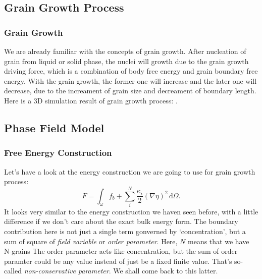 \documentclass[compress,xcolor={dvipsnames}]{beamer}
\newcommand{\bhref}[2]{
    \href{#1}{\color{blue}{#2}}
}
\begin{document}
\subsection{Grain Growth Process}
\begin{frame}
    \frametitle{Grain Growth}

    We are already familiar with the concepts of grain growth. After nucleation of grain from liquid or solid phase, the nuclei will growth due to the grain growth driving force, which is a combination of body free energy and grain boundary free energy. With the grain growth, the former one will increase and the later one will decrease, due to the increament of grain size and decreament of boundary length. Here is a 3D simulation result of grain growth process: \bhref{pic/Grgr3d_small.gif}{3D Grain Growth}.

\end{frame}

\subsection{Phase Field Model}
\begin{frame}
    \frametitle{Free Energy Construction}

    Let's have a look at the energy construction we are going to use for grain growth process:
    \[
        F = \int_\omega f_b + \sum_{i}^{N}\frac{\kappa_i}{2} \left( \nabla \eta \right)^2 \,\mathrm{d}\Omega.
    \]
    It looks very similar to the energy construction we haven seen before, with a little difference if we don't care about the exact bulk energy form. The boundary contribution here is not just a single term gonverned by `concentration', but a sum of square of \emph{field variable} or \emph{order parameter}. Here, \(N\) means that we have N-grains The order parameter acts like concentration, but the sum of order paramter could be any value instead of just be a fixed finite value. That's so-called \emph{non-conservative parameter}. We shall come back to this latter.

\end{frame}
\end{document}
